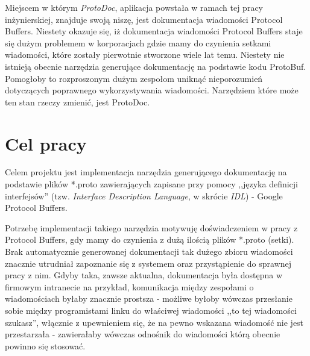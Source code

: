 \documentclass[pdflatex,11pt]{aghdpl}
\begin{document}
Miejscem w którym \textit{ProtoDoc}, aplikacja powstała w ramach tej pracy inżynierskiej, znajduje swoją niszę, jest dokumentacja wiadomości Protocol Buffers.
Niestety okazuje się, iż dokumentacja wiadomości Protocol Buffers staje się dużym problemem w korporacjach gdzie mamy do czynienia setkami wiadomości, które
zostały pierwotnie stworzone wiele lat temu. Niestety nie istnieją obecnie narzędzia generujące dokumentację na podstawie kodu ProtoBuf. Pomogłoby
to rozproszonym dużym zespołom uniknąć nieporozumień dotyczących poprawnego wykorzystywania wiadomości. Narzędziem które może ten stan rzeczy zmienić,
jest ProtoDoc.



\chapter{Cel pracy}
\label{sec:celePracy}

Celem projektu jest implementacja narzędzia generującego dokumentację na podstawie plików 
*.proto zawierających zapisane przy pomocy ,,języka definicji interfejsów'' (tzw. \textit{Interface Description Language}, w skrócie \textit{IDL}) - Google Protocol Buffers. 


Potrzebę implementacji takiego narzędzia motywuję doświadczeniem w pracy z Protocol Buffers, gdy mamy do czynienia z dużą ilością plików *.proto (setki). 
Brak automatycznie generowanej dokumentacji tak dużego zbioru wiadomości znacznie utrudniał zapoznanie się z systemem oraz przystąpienie do sprawnej pracy z nim.
Gdyby taka, zawsze aktualna, dokumentacja była dostępna w firmowym intranecie na przykład, komunikacja między zespołami o wiadomościach byłaby znacznie prostsza - 
możliwe byłoby wówczas przesłanie sobie między programistami linku do właściwej wiadomości ,,to tej wiadomości szukasz'', włącznie z upewnieniem się, że na pewno
wskazana wiadomość nie jest przestarzała - zawierałaby wówczas odnośnik do wiadomości którą obecnie powinno się stosować.
\end{document}
